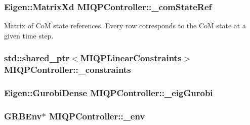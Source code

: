 \hypertarget{classMIQPController_ab74859a8dd208f3fc7608391d318d469}{
\subsubsection[{\-\_\-com\-State\-Ref}]{\setlength{\rightskip}{0pt plus 5cm}\-Eigen\-::\-Matrix\-Xd {\bf \-M\-I\-Q\-P\-Controller\-::\-\_\-com\-State\-Ref}}}\label{classMIQPController_ab74859a8dd208f3fc7608391d318d469}
\-Matrix of \-Co\-M state references. \-Every row corresponds to the \-Co\-M state at a given time step. \hypertarget{classMIQPController_affac62ccd729155720b16de3137ef3f5}{
\subsubsection[{\-\_\-constraints}]{\setlength{\rightskip}{0pt plus 5cm}std\-::shared\-\_\-ptr$<${\bf \-M\-I\-Q\-P\-Linear\-Constraints}$>$ {\bf \-M\-I\-Q\-P\-Controller\-::\-\_\-constraints}}}\label{classMIQPController_affac62ccd729155720b16de3137ef3f5}
\hypertarget{classMIQPController_a6d15db521a6b9c4e0b641709fef77373}{
\subsubsection[{\-\_\-eig\-Gurobi}]{\setlength{\rightskip}{0pt plus 5cm}\-Eigen\-::\-Gurobi\-Dense {\bf \-M\-I\-Q\-P\-Controller\-::\-\_\-eig\-Gurobi}}}\label{classMIQPController_a6d15db521a6b9c4e0b641709fef77373}
\hypertarget{classMIQPController_aec530057d97a52549fdc3823a48f73cf}{
\subsubsection[{\-\_\-env}]{\setlength{\rightskip}{0pt plus 5cm}\-G\-R\-B\-Env$\ast$ {\bf \-M\-I\-Q\-P\-Controller\-::\-\_\-env}}}\label{classMIQPController_aec530057d97a52549fdc3823a48f73cf}
